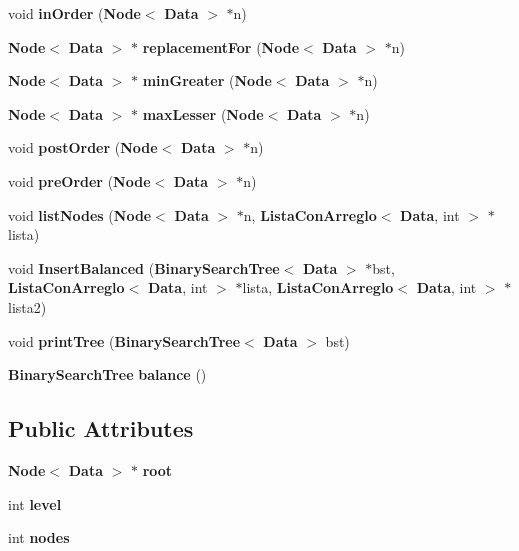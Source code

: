 \begin{DoxyCompactItemize}
\item 
void {\bf in\-Order} ({\bf Node}$<$ {\bf Data} $>$ $\ast$n)
\item 
{\bf Node}$<$ {\bf Data} $>$ $\ast$ {\bfseries replacement\-For} ({\bf Node}$<$ {\bf Data} $>$ $\ast$n)\label{class_binary_search_tree_a828682ddfca43a370878a76e4bf15925}

\item 
{\bf Node}$<$ {\bf Data} $>$ $\ast$ {\bfseries min\-Greater} ({\bf Node}$<$ {\bf Data} $>$ $\ast$n)\label{class_binary_search_tree_a3daf2b4f29a3916c1a3a74889bb0dcc6}

\item 
{\bf Node}$<$ {\bf Data} $>$ $\ast$ {\bfseries max\-Lesser} ({\bf Node}$<$ {\bf Data} $>$ $\ast$n)\label{class_binary_search_tree_a9e12b403f7677f13b1a48df59c876a0d}

\item 
void {\bf post\-Order} ({\bf Node}$<$ {\bf Data} $>$ $\ast$n)
\item 
void {\bf pre\-Order} ({\bf Node}$<$ {\bf Data} $>$ $\ast$n)
\item 
void {\bf list\-Nodes} ({\bf Node}$<$ {\bf Data} $>$ $\ast$n, {\bf Lista\-Con\-Arreglo}$<$ {\bf Data}, int $>$ $\ast$lista)
\item 
void {\bf Insert\-Balanced} ({\bf Binary\-Search\-Tree}$<$ {\bf Data} $>$ $\ast$bst, {\bf Lista\-Con\-Arreglo}$<$ {\bf Data}, int $>$ $\ast$lista, {\bf Lista\-Con\-Arreglo}$<$ {\bf Data}, int $>$ $\ast$lista2)
\item 
void {\bfseries print\-Tree} ({\bf Binary\-Search\-Tree}$<$ {\bf Data} $>$ bst)\label{class_binary_search_tree_a63c054c446edeb2003f811bcf9fbe1bb}

\item 
{\bf Binary\-Search\-Tree} {\bf balance} ()
\end{DoxyCompactItemize}
\subsection*{Public Attributes}
\begin{DoxyCompactItemize}
\item 
{\bf Node}$<$ {\bf Data} $>$ $\ast$ {\bfseries root}\label{class_binary_search_tree_ad7242fa25135e33d45ce605c3692b9c0}

\item 
int {\bfseries level}\label{class_binary_search_tree_a8509e4127898bc6305c8096e1a2e38bb}

\item 
int {\bfseries nodes}\label{class_binary_search_tree_af174a4f9efd9456210c476f1f97081da}

\end{DoxyCompactItemize}


